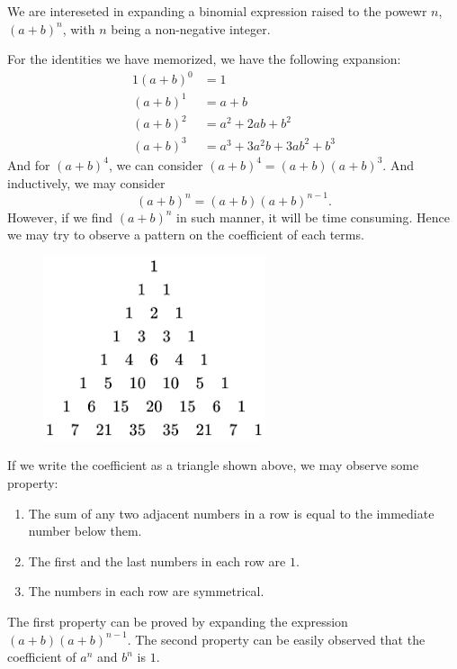 
\begin{mysubsection}{}
    We are intereseted in expanding a binomial expression raised to the powewr $n$, $(a+b)^n$, with $n$ being a non-negative integer.

    For the identities we have memorized, we have the following expansion:
    \begin{alignat*}{1}
        (a+b)^0&= 1\\
        (a+b)^1&= a+b\\
        (a+b)^2&= a^2+2ab+b^2\\
        (a+b)^3&= a^3+3a^2b+3ab^2+b^3
    \end{alignat*}
    And for $(a+b)^4$, we can consider $(a+b)^4=(a+b)(a+b)^3$. And inductively, we may consider
    \[(a+b)^n=(a+b)(a+b)^{n-1}.\]
    However, if we find $(a+b)^n$ in such manner, it will be time consuming. Hence we may try to observe a pattern on the coefficient of each terms.
    \begin{figure}[H]
        \centering
        \includegraphics[width=.4\linewidth]{./co3_pic/PascalTriangleNum.png}
    \end{figure}
    If we write the coefficient as a triangle shown above, we may observe some property:
    \begin{enumerate}
        \item The sum of any two adjacent numbers in a row is equal to the immediate number below them.
        \item The first and the last numbers in each row are $1$.
        \item The numbers in each row are symmetrical.
    \end{enumerate}
    The first property can be proved by expanding the expression $(a+b)(a+b)^{n-1}$. The second property can be easily observed that the coefficient of $a^n$ and $b^n$ is $1$.


\end{mysubsection}
